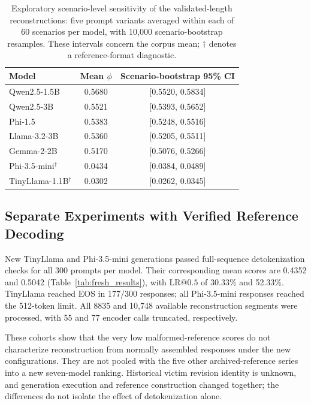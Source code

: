 \documentclass[electronics,article,submit,pdftex,moreauthors]{Definitions/mdpi}
\begin{document}
\begin{table}[ht]
\centering
\caption{Exploratory scenario-level sensitivity of the validated-length reconstructions: five prompt variants averaged within each of 60 scenarios per model, with 10,000 scenario-bootstrap resamples. These intervals concern the corpus mean; $\dagger$ denotes a reference-format diagnostic.}
\label{tab:scenario_sensitivity}
\begin{tabular}{l c c}
\toprule
Model & Mean $\phi$ & Scenario-bootstrap 95\% CI \\
\midrule
Qwen2.5-1.5B & 0.5680 & [0.5520, 0.5834] \\
Qwen2.5-3B & 0.5521 & [0.5393, 0.5652] \\
Phi-1.5 & 0.5383 & [0.5248, 0.5516] \\
Llama-3.2-3B & 0.5360 & [0.5205, 0.5511] \\
Gemma-2-2B & 0.5170 & [0.5076, 0.5266] \\
Phi-3.5-mini$^{\dagger}$ & 0.0434 & [0.0384, 0.0489] \\
TinyLlama-1.1B$^{\dagger}$ & 0.0302 & [0.0262, 0.0345] \\
\bottomrule
\end{tabular}
\end{table}

\subsection{Separate Experiments with Verified Reference Decoding}\label{sec:fresh}
New TinyLlama and Phi-3.5-mini generations passed full-sequence detokenization checks for all 300 prompts per model. Their corresponding mean scores are 0.4352 and 0.5042 (Table~\ref{tab:fresh_results}), with $\mathrm{LR}@0.5$ of 30.33\% and 52.33\%. TinyLlama reached EOS in 177/300 responses; all Phi-3.5-mini responses reached the 512-token limit. All 8835 and 10,748 available reconstruction segments were processed, with 55 and 77 encoder calls truncated, respectively.

These cohorts show that the very low malformed-reference scores do not characterize reconstruction from normally assembled responses under the new configurations. They are not pooled with the five other archived-reference series into a new seven-model ranking. Historical victim revision identity is unknown, and generation execution and reference construction changed together; the differences do not isolate the effect of detokenization alone.
\end{document}
